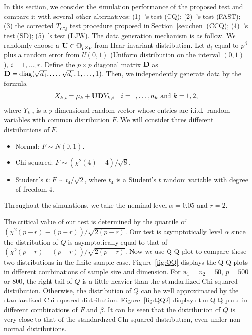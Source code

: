 \documentclass[3p]{elsarticle}
\DeclareMathOperator{\mydiag}{diag}
\theoremstyle{plain}
\theoremstyle{definition}
\theoremstyle{remark}
\begin{document}
In this section, we consider the simulation performance of the proposed test and compare it with several other alternatives: (1)~\cite{Chen2010A}'s test (CQ); (2)~\cite{Ma2015A}'s test (FAST); (3) the corrected $T_{CQ}$ test procedure proposed in Section~\ref{sec:chen} (CCQ); (4)~\cite{Srivastava2008A}'s test (SD); (5)~\cite{Lopes2015A}'s test (LJW).
The data generation mechanism is as follow.
We randomly choose a $\mathbf{U}\in\mathbb{O}_{p\times p}$ from Haar invariant distribution.
Let $d_{i}$ equal to $p^{\beta}$ plus a random error from $U(0,1)$ (Uniform distribution on the interval $(0,1)$), $i=1,\ldots, r$.
Define the $p\times p$ diagonal matrix $\mathbf{D}$ as $\BD=\mydiag(\sqrt{d_1},\ldots,\sqrt{d_r}, 1,\ldots, 1)$.
Then, we independently generate data by the formula
$$
X_{k,i}=\mu_k+\mathbf{U} \mathbf{D} Y_{k,i}\quad \text{$i=1,\ldots,n_k$ and $k=1,2$,}
$$
where $Y_{k,i}$ is a $p$ dimensional random vector whose entries are i.i.d.\ random variables with common distribution $F$.
We will consider three different distributions of $F$.
\begin{itemize}
    \item
        Normal: $F \sim N(0,1)$.
    \item
        Chi-squared:  $F\sim (\chi^2(4)-4)/\sqrt{8}$.
    \item
        Student's $t$: $F\sim t_4/\sqrt{2}$, where $t_4$ is a Student's $t$ random variable  with degree of freedom $4$.
\end{itemize}
Throughout the simulations, we take the nominal level $\alpha=0.05$ and $r=2$.

The critical value of our test is determined by the quantile of $(\chi^2(p-r)-(p-r))/\sqrt{2(p-r)}$.
Our test is asymptotically level $\alpha$ since the distribution of $Q$ is asymptotically equal to that of $(\chi^2(p-r)-(p-r))/\sqrt{2(p-r)}$.
Now we use Q-Q plot to compare these two distributions in the finite sample case.
Figure~\ref{fig:QQ} displays the Q-Q plots in different combinations of sample size and dimension.
For $n_1=n_2=50$, $p=500$ or $800$, the right tail of $Q$ is a little heavier than the standardized Chi-squared distribution.
Otherwise, the distribution of $Q$ can be well approximated by the standardized Chi-squared distribution.
Figure~\ref{fig:QQ2} displays the Q-Q plots in different combinations of $F$ and $\beta$.
It can be seen that the distribution of $Q$ is very close to that of the standardized Chi-squared distribution, even under non-normal distributions.
\end{document}
